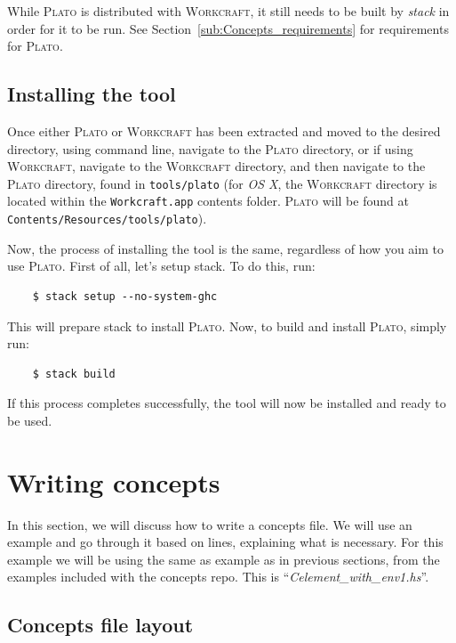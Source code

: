 \documentclass[british,technote,compsoc]{IEEEtran}
\newcommand{\noun}[1]{\textsc{#1}}
\begin{document}
While \noun{Plato} is distributed with \noun{Workcraft}, it still needs to be built by \emph{stack} in order for it to be run. 
See Section~\ref{sub:Concepts_requirements} for requirements for \noun{Plato}.

\newpage
\subsection{Installing the tool}

Once either \noun{Plato} or \noun{Workcraft} has been extracted and moved to the desired directory, using command line, navigate to the \noun{Plato} directory, or if using 
\noun{Workcraft}, navigate to the \noun{Workcraft} directory, and then navigate to the \noun{Plato} directory, found in \texttt{tools/plato} (for \emph{OS X}, the 
\noun{Workcraft} directory is located within the \texttt{Workcraft.app} contents folder. \noun{Plato} will be found at \texttt{Contents/Resources/tools/plato}).

Now, the process of installing the tool is the same, regardless of how you aim to use \noun{Plato}. First of all, let's setup stack. To do this, run: 

\begin{verbatim}
    $ stack setup --no-system-ghc
\end{verbatim}

\noindent This will prepare stack to install \noun{Plato}. Now, to build and install \noun{Plato}, simply run:

\begin{verbatim}
    $ stack build
\end{verbatim}

\noindent If this process completes successfully, the tool will now be installed and ready to be used. 

\section{Writing concepts \label{sec:concepts_layout}}

In this section, we will discuss how to write a concepts file. 
We will use an example and go through it based on lines, explaining what is necessary. For this example we will be using the same 
as example as in previous sections, from the examples included with the concepts repo. This is ``\emph{Celement\_with\_env1.hs}''.

\subsection{Concepts file layout}
\end{document}
